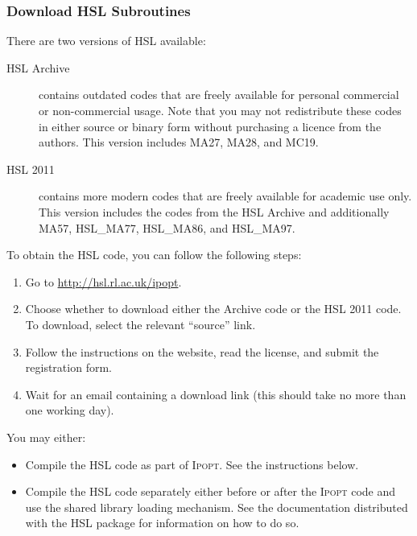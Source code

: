 \documentclass[10pt]{article}
\newcommand{\Ipopt}{\textsc{Ipopt}\xspace}
\begin{document}
\subsubsection{Download HSL Subroutines}
\label{sec:HSL}

\vspace{0.1cm}
\noindent
There are two versions of HSL available:
\vspace{-0.2cm}
\begin{description}
\item[HSL Archive] contains outdated codes that are freely available for
personal commercial or non-com\-mer\-cial usage. Note that you may not
redistribute these codes in either source or binary form without purchasing a
licence from the authors. This version includes MA27, MA28, and MC19.
\item[HSL 2011] contains more modern codes that are freely available for
academic use only. This version includes the codes from the HSL Archive and additionally MA57, HSL\_MA77, HSL\_MA86, and HSL\_MA97.
\end{description}

To obtain the HSL code, you can follow the following steps:
\begin{enumerate}
\item Go to \url{http://hsl.rl.ac.uk/ipopt}.
\item Choose whether to download either the Archive code or the HSL 2011
   code. To download, select the relevant
   ``source'' link.
\item Follow the instructions on the website, read the license, and
   submit the registration form.
\item Wait for an email containing a download link (this should take no
   more than one working day).
\end{enumerate}

\noindent
You may either:
\begin{itemize}
   \item Compile the HSL code as part of \Ipopt. See the instructions below.
   \item Compile the HSL code separately either before or after the \Ipopt code
      and use the shared library loading mechanism. See the documentation
      distributed with the HSL package for information on how to do so.
\end{itemize}
\end{document}
